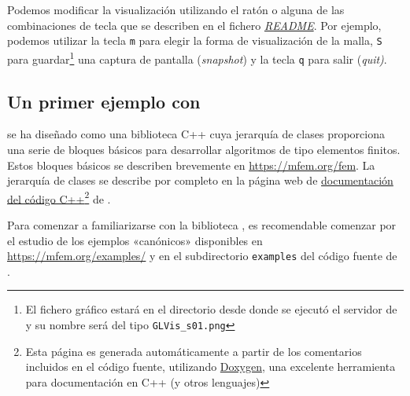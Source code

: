 Podemos modificar la visualización utilizando el ratón o alguna de las
combinaciones de tecla que se describen en el fichero
\href{https://raw.githubusercontent.com/glvis/glvis/master/README}{\textit{README}}. Por
ejemplo, podemos utilizar la tecla \texttt{m} para elegir la forma de
visualización de la malla, \texttt{S} para guardar\footnote{El fichero
  gráfico estará en el directorio desde donde se ejecutó el servidor
  de \glvis y su nombre será del tipo \texttt{GLVis\_s01.png}} una
captura de pantalla (\textit{snapshot}) y la tecla \texttt{q} para
salir (\textit{quit)}.


\subsection{Un primer ejemplo con \mfem}
\label{sec:3:un-primer-ejemplo}

\mfem se ha diseñado como una biblioteca C++ cuya jerarquía de clases
proporciona una serie de bloques básicos para desarrollar algoritmos
de tipo elementos finitos. Estos bloques básicos se describen
brevemente en \url{https://mfem.org/fem}. La jerarquía de clases se
describe por completo en la página web de
\href{https://mfem.github.io/doxygen/html/index.html}{documentación
  del código C++}\footnote{Esta página es generada automáticamente a
  partir de los comentarios incluidos en el código fuente, utilizando
  \href{https://www.doxygen.nl/index.html}{Doxygen}, una excelente
  herramienta para documentación en C++ (y otros lenguajes)} de \mfem.

Para comenzar a familiarizarse con la biblioteca \mfem, es
recomendable comenzar por el estudio de los ejemplos «canónicos»
disponibles en \url{https://mfem.org/examples/} y en el subdirectorio
\texttt{examples} del código fuente de \mfem.

